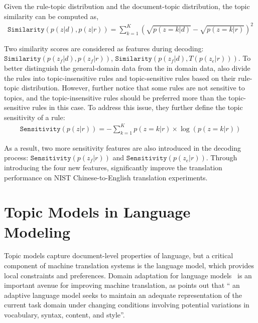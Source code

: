 Given the rule-topic distribution and the document-topic distribution, the topic similarity can be computed as,
\begin{align}
\texttt{Similarity}(p(z|d), p(z|r)) = \sum_{k=1}^{K} (\sqrt{p(z=k|d)} - \sqrt{p(z=k|r)})^2
\end{align}

Two similarity scores are considered as features during decoding: $\texttt{Similarity}(p(z_f|d), p(z_f|r))$, $\texttt{Similarity}(p(z_f|d), T(p(z_e|r)))$. To better distinguish the general-domain data from the in domain data, \citet{xiao-12} also divide the rules into topic-insensitive rules and topic-sensitive rules based on their rule-topic distribution. However, \citet{xiao-12} further notice that some rules are not sensitive to topics, and the topic-insensitive rules should be preferred more than the topic-sensitive rules in this case. To address this issue, they further define the topic sensitivity of a rule:
\begin{align}
\texttt{Sensitivity}(p(z|r)) = - \sum_{k=1}^{K} p(z=k|r) \times \log(p(z=k|r))
\end{align}

As a result, two more sensitivity features are also introduced in the decoding process: $\texttt{Sensitivity}(p(z_f|r))$ and $\texttt{Sensitivity}(p(z_e|r))$. Through introducing the four new features, \citet{xiao-12} significantly improve the translation performance on NIST Chinese-to-English translation experiments.

\section{Topic Models in Language Modeling}


Topic models capture document-level properties of language, but a critical component of machine translation systems is the language model, which provides local constraints and preferences. Domain adaptation for language models~\citep{Bellegarda-04,wood-09} is an important avenue for improving machine translation, as \citet{Bellegarda-04} points out that `` an adaptive language model seeks to maintain an adequate representation of the current task domain under changing conditions involving potential variations in vocabulary, syntax, content, and style''.


